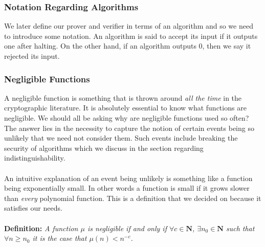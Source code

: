 \documentclass{article}
\newcommand{\N}{{\mathbf N}}
\begin{document}
\subsubsection{Notation Regarding Algorithms}
We later define our prover and verifier in terms of an algorithm and so we need to introduce some notation. An algorithm is said to accept its input if it outputs one after halting. On the other hand, if an algorithm outputs 0, then we say it rejected its input.
\subsubsection{Negligible Functions}
A negligible function is something that is thrown around \textit{all the time} in the cryptographic literature. It is absolutely essential to know what functions are negligible. We should all be asking why are negligible functions used so often? The answer lies in the necessity to capture the notion of certain events being so unlikely that we need not consider them. Such events include breaking the security of algorithms which we discuss in the section regarding indistinguishability. \\ \\
\noindent An intuitive explanation of an event being unlikely is something like a function being exponentially small. In other words a function is small if it grows slower than \textit{every} polynomial function. This is a definition that we decided on because it satisfies our needs.\\ \\
\noindent \textbf{Definition:} \emph{A function $\mu$ is negligible if and only if $\forall{c} \in \N$, $\exists n_0 \in \N$ such that $\forall n \geq n_0$ it is the case that $\mu(n) < n^{-c}$.}
\end{document}
